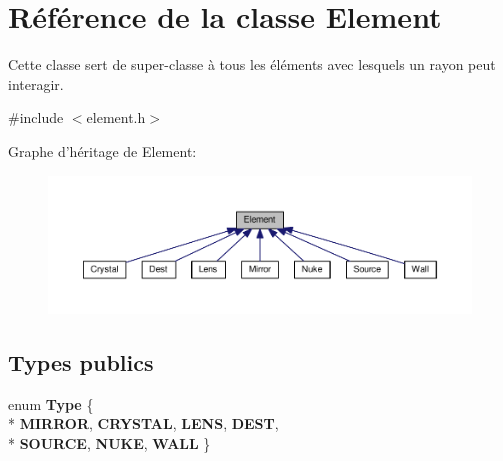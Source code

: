 \hypertarget{classElement}{\section{Référence de la classe Element}
\label{classElement}
}


Cette classe sert de super-\/classe à tous les éléments avec lesquels un rayon peut interagir.  




{\ttfamily \#include $<$element.\+h$>$}



Graphe d'héritage de Element\+:
\nopagebreak
\begin{figure}[H]
\begin{center}
\leavevmode
\includegraphics[width=350pt]{d8/dd6/classElement__inherit__graph}
\end{center}
\end{figure}
\subsection*{Types publics}
\begin{DoxyCompactItemize}
\item 
\hypertarget{classElement_a009a3be4c3a037a72e292b2464c9cbc5}{enum {\bfseries Type} \{ \\*
{\bfseries M\+I\+R\+R\+O\+R}, 
{\bfseries C\+R\+Y\+S\+T\+A\+L}, 
{\bfseries L\+E\+N\+S}, 
{\bfseries D\+E\+S\+T}, 
\\*
{\bfseries S\+O\+U\+R\+C\+E}, 
{\bfseries N\+U\+K\+E}, 
{\bfseries W\+A\+L\+L}
 \}}\label{classElement_a009a3be4c3a037a72e292b2464c9cbc5}

\end{DoxyCompactItemize}
